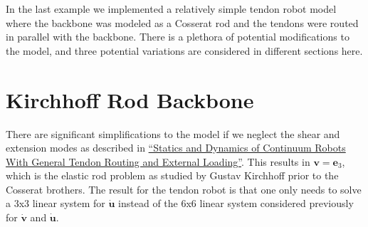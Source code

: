 \documentclass[12pt]{article}
\begin{document}
\makeatletter
\renewcommand{\@maketitle}{
\newpage
\null
\vskip 2em
\begin{center}
{\LARGE \@title \par}
\end{center}
\par
} \makeatother

\maketitle

In the last example we implemented a relatively simple tendon robot model where the backbone was modeled as a Cosserat rod and the tendons were routed in parallel with the backbone. There is a plethora of potential modifications to the model, and three potential variations are considered in different sections here.

\section{Kirchhoff Rod Backbone}

There are significant simplifications to the model if we neglect the shear and extension modes as described in \href{https://ieeexplore.ieee.org/document/5957337}{``Statics and Dynamics of Continuum Robots With General Tendon Routing and External Loading''}. This results in $\boldsymbol{v} = \boldsymbol{e}_3$, which is the elastic rod problem as studied by Gustav Kirchhoff prior to the Cosserat brothers. The result for the tendon robot is that one only needs to solve a 3x3 linear system for $\dot{\boldsymbol{u}}$ instead of the 6x6 linear system considered previously for $\dot{\boldsymbol{v}}$ and $\dot{\boldsymbol{u}}$.
\end{document}

